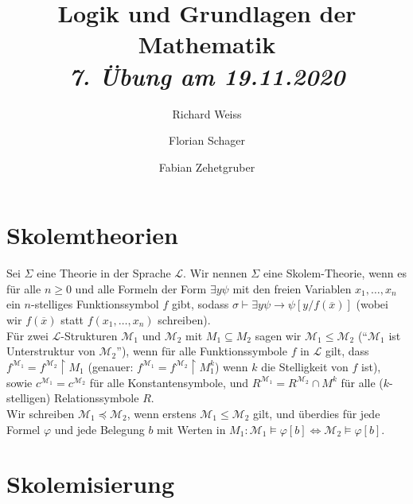\documentclass{article}
\title
{
  Logik und Grundlagen der Mathematik \\
  \vspace{4pt}
  \normalsize
  \textit{7. Übung am 19.11.2020}
}
\author
{
  Richard Weiss
  \and
  Florian Schager
  \and
  Fabian Zehetgruber
}
\date{}
\begin{document}
\maketitle
\section*{Skolemtheorien}
Sei $\Sigma$ eine Theorie in der Sprache $\mathscr{L}$. Wir nennen $\Sigma$ eine
Skolem-Theorie, wenn es für alle $n \geq 0$ und alle Formeln der Form $\exists y \psi$
mit den freien Variablen $x_1,\dots,x_n$ ein $n$-stelliges Funktionssymbol $f$ gibt,
sodass $\sigma \vdash \exists y \psi \rightarrow \psi[y/f(\overline{x})]$ (wobei wir
$f(\overline{x})$ statt $f(x_1,\dots,x_n)$ schreiben). \\
Für zwei $\mathscr{L}$-Strukturen $\mathscr{M}_1$ und $\mathscr{M}_2$ mit $M_1 \subseteq M_2$
sagen wir $\mathscr{M}_1 \leq \mathscr{M}_2$ (``$\mathscr{M}_1$ ist Unterstruktur von $\mathscr{M}_2$''),
wenn für alle Funktionssymbole $f$ in $\mathscr{L}$ gilt, dass
$f^{\mathscr{M}_1} = f^{\mathscr{M}_2}\upharpoonright M_1$ (genauer:
$f^{\mathscr{M}_1} = f^{\mathscr{M}_2}\upharpoonright M_1^k$) wenn $k$ die Stelligkeit von $f$ ist),
sowie $c^{\mathscr{M}_1} = c^{\mathscr{M}_2}$ für alle Konstantensymbole, und
$R^{\mathscr{M}_1} = R^{\mathscr{M}_2}\cap M^k$ für alle ($k$-stelligen) Relationssymbole $R$. \\
Wir schreiben $\mathscr{M}_1 \preccurlyeq \mathscr{M}_2$, wenn erstens $\mathscr{M}_1 \leq \mathscr{M}_2$
gilt, und überdies für jede Formel $\varphi$ und jede Belegung $b$ mit Werten in
$M_1: \mathscr{M}_1 \vDash \varphi[b] \iff \mathscr{M}_2 \vDash \varphi[b]$.




\section*{Skolemisierung}


\end{document}
